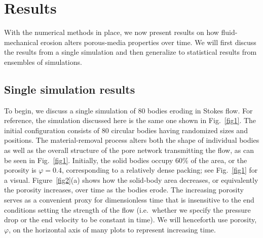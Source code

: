 \documentclass[3p]{elsarticle}
\begin{document}
\section{Results}
\label{sec:results}

With the numerical methods in place, we now present results on how fluid-mechanical erosion alters porous-media properties over time. We will first discuss the results from a single simulation and then generalize to statistical results from ensembles of simulations.

\subsection{Single simulation results}
\label{sec:single_sim}

To begin, we discuss a single simulation of 80 bodies eroding in Stokes flow. For reference, the simulation discussed here is the same one shown in Fig.~\ref{fig1}. The initial configuration consists of 80 circular bodies having randomized sizes and positions. The material-removal process alters both the shape of individual bodies as well as the overall structure of the pore network transmitting the flow, as can be seen in Fig.~\ref{fig1}. Initially, the solid bodies occupy $60\%$ of the area, or the porosity is $\varphi = 0.4$, corresponding to a relatively dense packing; see Fig.~\ref{fig1} for a visual. Figure~\ref{fig2}(a) shows how the solid-body area decreases, or equivalently the porosity increases, over time as the bodies erode. The increasing porosity serves as a convenient proxy for dimensionless time that is insensitive to the end conditions setting the strength of the flow (i.e.~whether we specify the pressure drop or the end velocity to be constant in time). We will henceforth use porosity, $\varphi$, on the horizontal axis of many plots to represent increasing time.
\end{document}
